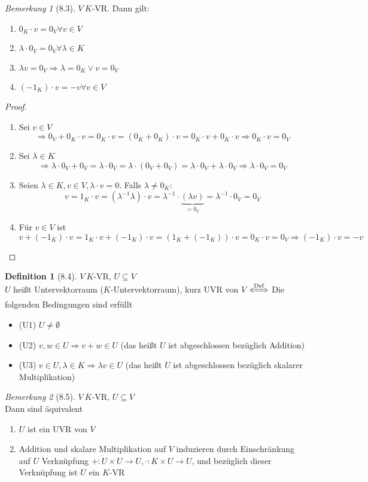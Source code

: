\documentclass[a4paper]{scrartcl}
\DeclareMathOperator{\Forall}{\forall}
\theoremstyle{definition}
\newtheorem{defn}{Definition}
\theoremstyle{plain}
\theoremstyle{plain}
\theoremstyle{remark}
\newtheorem{remark}{Bemerkung}
\theoremstyle{remark}
\theoremstyle{remark}
\begin{document}
\begin{remark}[8.3]
$V~K$-VR. Dann gilt:
\begin{enumerate}
\item $0_K \cdot v = 0_V \Forall v\in V$
\item $\lambda \cdot 0_V = 0_V \Forall \lambda\in K$
\item $\lambda v = 0_V \Rightarrow \lambda = 0_K \vee v = 0_V$
\item $(-1_K)\cdot v = -v \Forall v\in V$
\end{enumerate}
\end{remark}
\begin{proof}
\begin{enumerate}
\item Sei $v \in V$
     \[\Rightarrow 0_V + 0_K \cdot v = 0_K \cdot v = (0_K + 0_K)\cdot v = 0_K\cdot v + 0_K \cdot v \Rightarrow 0_K \cdot v = 0_V\]
\item Sei $\lambda \in K$
     \[\Rightarrow \lambda \cdot 0_V + 0_V = \lambda \cdot 0_V = \lambda \cdot (0_V + 0_V) = \lambda\cdot 0_V + \lambda \cdot 0_V \Rightarrow \lambda \cdot 0_V = 0_V\]
\item Seien $\lambda \in K, v\in V, \lambda\cdot v = 0$. Falls $\lambda \neq 0_K:$
     \[v = 1_K \cdot v = (\lambda^{-1} \lambda)\cdot v = \lambda^{-1}\cdot \underbrace{(\lambda v)}_{= 0_V} = \lambda^{-1} \cdot 0_V = 0_V\]
\item Für $v\in V$ ist
\[v + (-1_K) \cdot v = 1_K \cdot v + (-1_K)\cdot v = (1_K + (-1_K))\cdot v = 0_K \cdot v = 0_V \Rightarrow (-1_K)\cdot v = -v\]
\end{enumerate}
\end{proof}
\begin{defn}[8.4]
$V~K$-VR, $U\subseteq V$ \\
  $U$ heißt Untervektorraum ($K$-Untervektorraum), kurz UVR von $V$ $\xLeftrightarrow{\text{Def}}$ Die folgenden Bedingungen sind erfüllt
\begin{itemize}
\item (U1) $U\neq \emptyset$
\item (U2) $v,w \in U \Rightarrow v + w \in U$ \hfill (das heißt $U$ ist abgeschlossen bezüglich Addition)
\item (U3) $v\in U, \lambda \in K \Rightarrow \lambda v \in U$ \hfill (das heißt $U$ ist abgeschlossen bezüglich skalarer Multiplikation)
\end{itemize}
\end{defn}
\begin{remark}[8.5]
$V~K$-VR, $U\subseteq V$ \\
  Dann sind äquivalent
\begin{enumerate}
\item $U$ ist ein UVR von $V$
\item Addition und skalare Multiplikation auf $V$ induzieren durch Einschränkung auf $U$ Verknüpfung $+: U\times U\to U, \cdot:K\times U \to U$, und bezüglich dieser Verknüpfung ist $U$ ein $K$-VR
\end{enumerate}
\end{remark}
\end{document}
